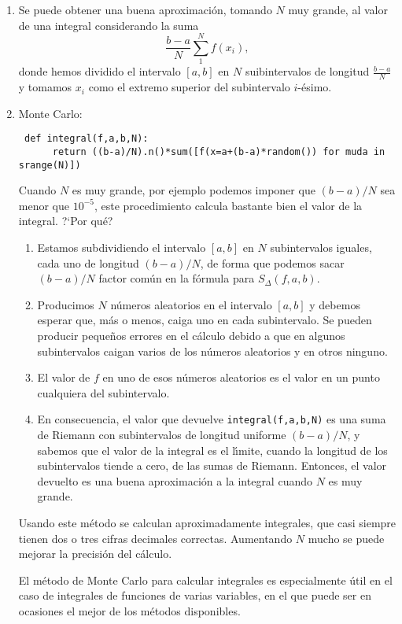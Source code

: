 \begin{enumerate}

\item Se puede obtener una buena aproximaci\'on, tomando $N$ muy grande,  al
valor de una integral considerando la suma
\[\frac{b-a}{N}\sum_{1}^{N} f(x_i),\]
\noindent donde hemos dividido el intervalo $[a,b]$ en $N$ suibintervalos de
longitud $\frac{b-a}{N}$ y tomamos $x_i$ como el extremo superior del
subintervalo $i$-\'esimo. 

\item {\sc Monte Carlo:}
\begin{lstlisting}
 def integral(f,a,b,N):
      return ((b-a)/N).n()*sum([f(x=a+(b-a)*random()) for muda in srange(N)])
\end{lstlisting}

Cuando $N$ es muy grande, por ejemplo podemos imponer que $(b-a)/N$ sea menor
que $10^{-5}$, este procedimiento calcula bastante bien el valor de la
integral. 
?`Por qu\'e? 
\begin{enumerate}
\item Estamos subdividiendo el intervalo $[a,b]$ en $N$ subintervalos iguales,
cada uno de longitud $(b-a)/N$, de forma que podemos sacar $(b-a)/N$ factor
com\'un en la f\'ormula para $S_{\Delta}(f,a,b)$.
\item Producimos $N$ n\'umeros aleatorios en el intervalo $[a,b]$ y debemos
esperar que, m\'as o menos, caiga uno en cada subintervalo. Se pueden producir
peque\~nos errores en el c\'alculo debido a que en algunos subintervalos caigan
varios de los n\'umeros aleatorios y en otros ninguno.
\item El valor de $f$ en uno de esos n\'umeros aleatorios es el valor en un 
punto cualquiera del subintervalo.
\item En consecuencia, el valor que devuelve \lstinline|integral(f,a,b,N)| es 
una suma  de Riemann con subintervalos de longitud uniforme $(b-a)/N$, y 
sabemos que el valor de la integral es el l\'{\i}mite, cuando la longitud de 
los subintervalos tiende a cero, de las sumas de Riemann. Entonces, el valor 
devuelto es una buena aproximaci\'on a la integral cuando $N$ es muy grande. 
\end{enumerate}
Usando este m\'etodo se calculan aproximadamente integrales,  que casi siempre
tienen dos o tres cifras decimales correctas.  Aumentando $N$ mucho se puede
mejorar la precisi\'on del c\'alculo. 

El m\'etodo de Monte Carlo para calcular integrales es especialmente \'util en 
el caso de integrales de funciones de varias variables, en el que puede ser en 
ocasiones el mejor de los m\'etodos disponibles. 

\end{enumerate}


